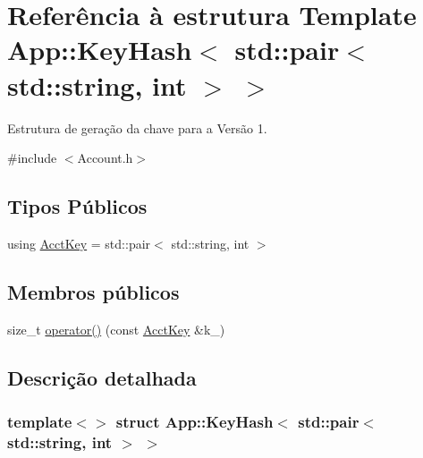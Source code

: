 \hypertarget{structApp_1_1KeyHash_3_01std_1_1pair_3_01std_1_1string_00_01int_01_4_01_4}{}\section{Referência à estrutura Template App\+:\+:Key\+Hash$<$ std\+:\+:pair$<$ std\+:\+:string, int $>$ $>$}
\label{structApp_1_1KeyHash_3_01std_1_1pair_3_01std_1_1string_00_01int_01_4_01_4}


Estrutura de geração da chave para a Versão 1.  




{\ttfamily \#include $<$Account.\+h$>$}

\subsection*{Tipos Públicos}
\begin{DoxyCompactItemize}
\item 
using \hyperlink{structApp_1_1KeyHash_3_01std_1_1pair_3_01std_1_1string_00_01int_01_4_01_4_a454607ff4e38afa850039a3a8f59061e}{Acct\+Key} = std\+::pair$<$ std\+::string, int $>$
\end{DoxyCompactItemize}
\subsection*{Membros públicos}
\begin{DoxyCompactItemize}
\item 
size\+\_\+t \hyperlink{structApp_1_1KeyHash_3_01std_1_1pair_3_01std_1_1string_00_01int_01_4_01_4_a54dfa866f4c2942731203f5219142564}{operator()} (const \hyperlink{structApp_1_1KeyHash_3_01std_1_1pair_3_01std_1_1string_00_01int_01_4_01_4_a454607ff4e38afa850039a3a8f59061e}{Acct\+Key} \&k\+\_\+)
\end{DoxyCompactItemize}


\subsection{Descrição detalhada}
\subsubsection*{template$<$$>$\newline
struct App\+::\+Key\+Hash$<$ std\+::pair$<$ std\+::string, int $>$ $>$}

